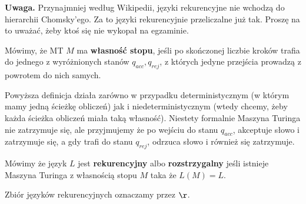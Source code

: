 \textbf{Uwaga.} Przynajmniej według Wikipedii, języki rekurencyjne nie wchodzą do hierarchii Chomsky'ego. Za to języki rekurencyjnie przeliczalne już tak. Proszę na to uważać, żeby ktoś się nie wykopał na egzaminie. 

\begin{definition}
    Mówimy, że MT \( M \) ma \textbf{własność stopu}, jeśli po skończonej liczbie kroków trafia do jednego z wyróżnionych stanów \( q_{acc}, q_{rej} \), z których jedyne przejścia prowadzą z powrotem do nich samych.
\end{definition}

Powyższa definicja działa zarówno w przypadku deterministycznym (w którym mamy jedną ścieżkę obliczeń) jak i niedeterministycznym (wtedy chcemy, żeby każda ścieżka obliczeń miała taką własność).
Niestety formalnie Maszyna Turinga nie zatrzymuje się, ale przyjmujemy że po wejściu do stanu \( q_{acc} \), akceptuje słowo i zatrzymuje się, a gdy trafi do stanu \( q_{rej} \), odrzuca słowo i również się zatrzymuje.

\begin{definition}
    Mówimy że język \( L \) jest \textbf{rekurencyjny} albo \textbf{rozstrzygalny} jeśli istnieje Maszyna Turinga z własnością stopu \( M \) taka że \( L(M) = L \).
    
    Zbiór języków rekurencyjnych oznaczamy przez \( \r \).
\end{definition}